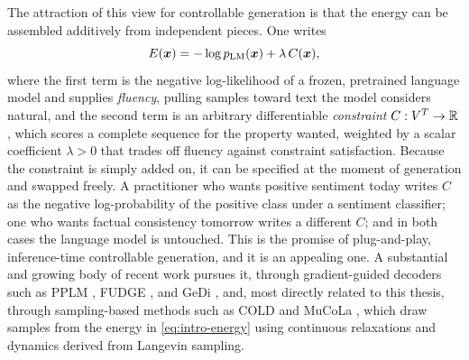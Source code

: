 The attraction of this view for controllable generation is that the energy can be assembled additively from independent pieces. One writes
\begin{equation}
    E(\bm{x}) = -\log p_{\text{LM}}(\bm{x}) + \lambda\, C(\bm{x}),
    \label{eq:intro-energy}
\end{equation}
where the first term is the negative log-likelihood of a frozen, pretrained language model and supplies \emph{fluency}, pulling samples toward text the model considers natural, and the second term is an arbitrary differentiable \emph{constraint} $C : V^{T} \to \mathbb{R}$, which scores a complete sequence for the property wanted, weighted by a scalar coefficient $\lambda > 0$ that trades off fluency against constraint satisfaction. Because the constraint is simply added on, it can be specified at the moment of generation and swapped freely. A practitioner who wants positive sentiment today writes $C$ as the negative log-probability of the positive class under a sentiment classifier; one who wants factual consistency tomorrow writes a different $C$; and in both cases the language model is untouched. This is the promise of plug-and-play, inference-time controllable generation, and it is an appealing one. A substantial and growing body of recent work pursues it, through gradient-guided decoders such as PPLM \citep{dathathri2020plug}, FUDGE \citep{yang2021fudge}, and GeDi \citep{krause2021gedi}, and, most directly related to this thesis, through sampling-based methods such as COLD \citep{qin2022cold} and MuCoLa \citep{kumar2022gradient}, which draw samples from the energy in \eqref{eq:intro-energy} using continuous relaxations and dynamics derived from Langevin sampling.

